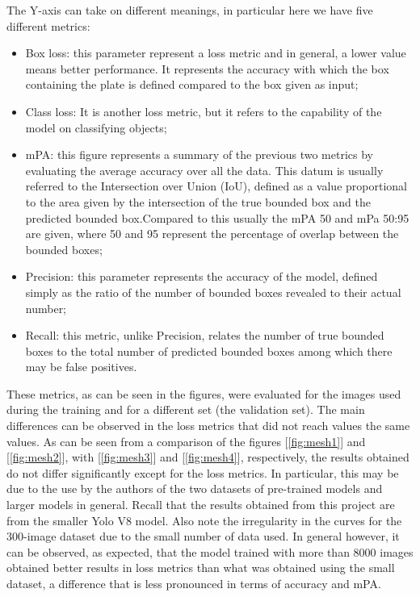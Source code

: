 \documentclass[12pt]{article}
\begin{document}
The Y-axis can take on different meanings, in particular here we have five different metrics:
\begin{itemize}
    \item Box loss: this parameter represent a loss metric and in general, a lower value means better performance. It represents the accuracy with which the box containing the plate is defined compared to the box given as input;
    \item Class loss: It is another loss metric, but it refers to the capability of the model on classifying objects;
    \item mPA: this figure represents a summary of the previous two metrics by evaluating the average accuracy over all the data. This datum is usually referred to the Intersection over Union (IoU), defined as a value proportional to the area given by the intersection of the true bounded box and the predicted bounded box.Compared to this usually the mPA 50 and mPa 50:95 are given, where 50 and 95 represent the percentage of overlap between the bounded boxes;
    \item Precision: this parameter represents the accuracy of the model, defined simply as the ratio of the number of bounded boxes revealed to their actual number;
    \item Recall: this metric, unlike Precision,  relates the number of true bounded boxes to the total number of predicted bounded boxes among which there may be false positives.
\end{itemize}

These metrics, as can be seen in the figures, were evaluated for the images used during the training and for a different set (the validation set). The main differences can be observed in the loss metrics that did not reach values the same values. As can be seen from a comparison of the figures [\ref{fig:mesh1}] and [\ref{fig:mesh2}], with [\ref{fig:mesh3}] and [\ref{fig:mesh4}], respectively, the results obtained do not differ significantly except for the loss metrics. In particular, this may be due to the use by the authors of the two datasets of pre-trained models and larger models in general. Recall that the results obtained from this project are from the smaller Yolo V8 model. Also note the irregularity in the curves for the 300-image dataset due to the small number of data used.
In general however, it can be observed, as expected, that the model trained with more than 8000 images obtained better results in loss metrics than what was obtained using the small dataset, a difference that is less pronounced in terms of accuracy and mPA.
\end{document}

